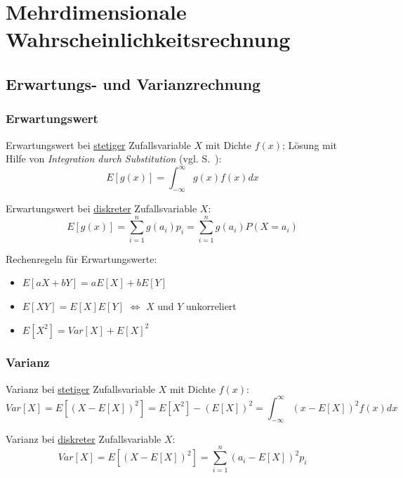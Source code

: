 \section{Mehrdimensionale Wahrscheinlichkeitsrechnung}

\subsection{Erwartungs- und Varianzrechnung}

\subsubsection{Erwartungswert}

Erwartungswert bei \underline{stetiger} Zufallsvariable \(X\) mit Dichte \(f(x)\); Lösung mit Hilfe von \emph{Integration durch Substitution} (vgl. S.~\pageref{substitution}):
\begin{equation*}
    E[g(x)]=\int_{-\infty}^{\infty}g(x)f(x)dx
\end{equation*}

Erwartungswert bei \underline{diskreter} Zufallsvariable \(X\):
\begin{equation*}
    E[g(x)]=\sum_{i=1}^{n}g(a_i)p_i = \sum_{i=1}^{n}g(a_i)P(X=a_i) 
\end{equation*}

Rechenregeln für Erwartungswerte:
\begin{itemize}
    \item \(E[aX+bY]=aE[X]+bE[Y]\)
    \item \(E[XY]=E[X]E[Y]\) \(\Leftrightarrow\) \(X\) und \(Y\) unkorreliert
    \item \(E[X^2]=Var[X]+E[X]^2\)
\end{itemize}


\subsubsection{Varianz}

Varianz bei \underline{stetiger} Zufallsvariable \(X\) mit Dichte \(f(x)\):
\begin{equation*}
    Var[X]=E[(X-E[X])^2]=E[X^2]-(E[X])^2=\int_{-\infty}^{\infty}(x-E[X])^2f(x)dx
\end{equation*}

Varianz bei \underline{diskreter} Zufallsvariable \(X\):
\begin{equation*}
    Var[X]=E[(X-E[X])^2]=\sum_{i=1}^{n}(a_i-E[X])^2p_i
\end{equation*}

